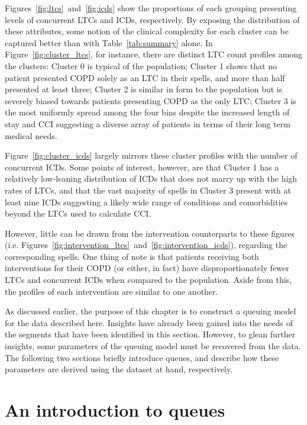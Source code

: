 Figures~\ref{fig:ltcs}~and~\ref{fig:icds} show the proportions of each grouping
presenting levels of concurrent LTCs and ICDs, respectively. By exposing the
distribution of these attributes, some notion of the clinical complexity for
each cluster can be captured better than with Table~\ref{tab:summary} alone. In
Figure~\ref{fig:cluster_ltcs}, for instance, there are distinct LTC count
profiles among the clusters: Cluster 0 is typical of the population; Cluster 1
shows that no patient presented COPD solely as an LTC in their spells, and more
than half presented at least three; Cluster 2 is similar in form to the
population but is severely biased towards patients presenting COPD as the only
LTC; Cluster 3 is the most uniformly spread among the four bins despite the
increased length of stay and CCI suggesting a diverse array of patients in
terms of their long term medical needs.

Figure~\ref{fig:cluster_icds} largely mirrors these cluster profiles with the
number of concurrent ICDs. Some points of interest, however, are that Cluster 1
has a relatively low-leaning distribution of ICDs that does not marry up with
the high rates of LTCs, and that the vast majority of spells in Cluster 3
present with at least nine ICDs suggesting a likely wide range of conditions and
comorbidities beyond the LTCs used to calculate CCI.\

However, little can be drawn from the intervention counterparts to these figures
(i.e. Figures~\ref{fig:intervention_ltcs}~and~\ref{fig:intervention_icds}),
regarding the corresponding spells. One thing of note is that patients receiving
both interventions for their COPD (or either, in fact) have disproportionately
fewer LTCs and concurrent ICDs when compared to the population. Aside from this,
the profiles of each intervention are similar to one another.

As discussed earlier, the purpose of this chapter is to construct a queuing
model for the data described here. Insights have already been gained into the
needs of the segments that have been identified in this section. However, to
glean further insights, some parameters of the queuing model must be recovered
from the data. The following two sections briefly introduce queues, and describe
how these parameters are derived using the dataset at hand, respectively.


\section{An introduction to queues}\label{sec:queuing}

